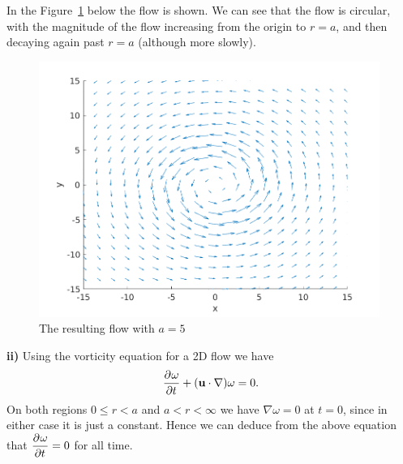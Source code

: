 \documentclass{article}
\def\*#1{\mathbf{#1}}
\begin{document}
%
In the Figure~\ref{fig:ai} below the flow is shown. We can see that the
flow is circular, with the magnitude of the flow increasing from the
origin to $r = a$, and then decaying again past $r = a$ (although more
slowly).
%
\begin{figure}[!ht]
    \includegraphics[width=30em]{as05fig1}
    \centering
    \caption{The resulting flow with $a = 5$}
    \label{fig:ai}
\end{figure}

\textbf{ii)} Using the vorticity equation for a 2D flow we have
%
\begin{equation*}
    \dpd{\omega}{t} + (\*u \cdot \nabla) \omega = 0
    .
\end{equation*}
%
On both regions $0 \leq r < a$ and $a < r < \infty$ we have $\nabla
\omega = 0$ at $t = 0$, since in either case it is just a constant.
Hence we can deduce from the above equation that $\dpd{\omega}{t} = 0$
for all time.
\end{document}
